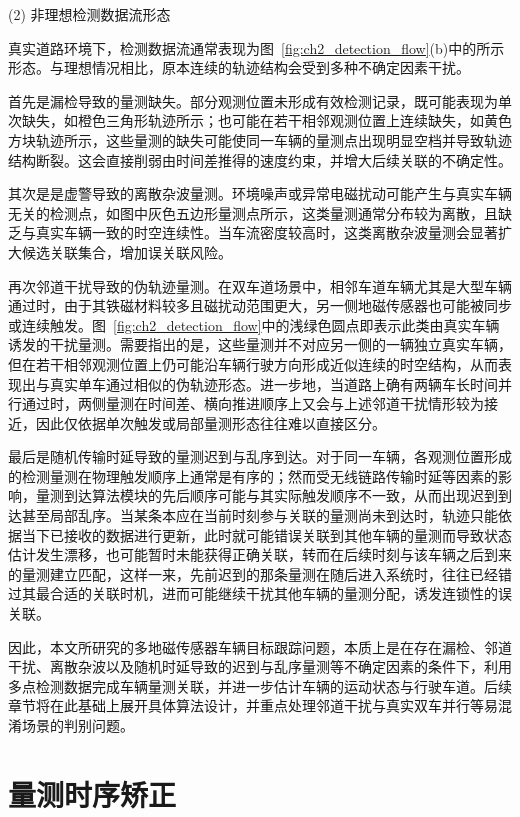 \documentclass{xdupgthesis}
\begin{document}
(2) 非理想检测数据流形态

真实道路环境下，检测数据流通常表现为图~\ref{fig:ch2_detection_flow}(b)中的所示形态。与理想情况相比，原本连续的轨迹结构会受到多种不确定因素干扰。

首先是漏检导致的量测缺失。部分观测位置未形成有效检测记录，既可能表现为单次缺失，如橙色三角形轨迹所示；也可能在若干相邻观测位置上连续缺失，如黄色方块轨迹所示，这些量测的缺失可能使同一车辆的量测点出现明显空档并导致轨迹结构断裂。这会直接削弱由时间差推得的速度约束，并增大后续关联的不确定性。

其次是是虚警导致的离散杂波量测。环境噪声或异常电磁扰动可能产生与真实车辆无关的检测点，如图中灰色五边形量测点所示，这类量测通常分布较为离散，且缺乏与真实车辆一致的时空连续性。当车流密度较高时，这类离散杂波量测会显著扩大候选关联集合，增加误关联风险。

再次邻道干扰导致的伪轨迹量测。在双车道场景中，相邻车道车辆尤其是大型车辆通过时，由于其铁磁材料较多且磁扰动范围更大，另一侧地磁传感器也可能被同步或连续触发。图~\ref{fig:ch2_detection_flow}中的浅绿色圆点即表示此类由真实车辆诱发的干扰量测。需要指出的是，这些量测并不对应另一侧的一辆独立真实车辆，但在若干相邻观测位置上仍可能沿车辆行驶方向形成近似连续的时空结构，从而表现出与真实单车通过相似的伪轨迹形态。进一步地，当道路上确有两辆车长时间并行通过时，两侧量测在时间差、横向推进顺序上又会与上述邻道干扰情形较为接近，因此仅依据单次触发或局部量测形态往往难以直接区分。

最后是随机传输时延导致的量测迟到与乱序到达。对于同一车辆，各观测位置形成的检测量测在物理触发顺序上通常是有序的；然而受无线链路传输时延等因素的影响，量测到达算法模块的先后顺序可能与其实际触发顺序不一致，从而出现迟到到达甚至局部乱序。当某条本应在当前时刻参与关联的量测尚未到达时，轨迹只能依据当下已接收的数据进行更新，此时就可能错误关联到其他车辆的量测而导致状态估计发生漂移，也可能暂时未能获得正确关联，转而在后续时刻与该车辆之后到来的量测建立匹配，这样一来，先前迟到的那条量测在随后进入系统时，往往已经错过其最合适的关联时机，进而可能继续干扰其他车辆的量测分配，诱发连锁性的误关联。

因此，本文所研究的多地磁传感器车辆目标跟踪问题，本质上是在存在漏检、邻道干扰、离散杂波以及随机时延导致的迟到与乱序量测等不确定因素的条件下，利用多点检测数据完成车辆量测关联，并进一步估计车辆的运动状态与行驶车道。后续章节将在此基础上展开具体算法设计，并重点处理邻道干扰与真实双车并行等易混淆场景的判别问题。




\section{量测时序矫正}
\end{document}
